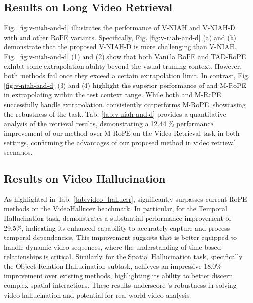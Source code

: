 
\setlength{\textfloatsep}{5pt}  %
\setlength{\intextsep}{5pt}     %
\setlength{\floatsep}{5pt} 

\subsection{Results on Long Video Retrieval}
Fig. \ref{fig:v-niah-and-d} illustrates the performance of V-NIAH and V-NIAH-D with \methodname and other RoPE variants. Specifically, Fig. \ref{fig:v-niah-and-d} (a) and (b) demonstrate that the proposed V-NIAH-D is more challenging than V-NIAH.
Fig. \ref{fig:v-niah-and-d} (1) and (2) show that both Vanilla RoPE and TAD-RoPE exhibit some extrapolation ability beyond the visual training context. However, both methods fail once they exceed a certain extrapolation limit.
In contrast, Fig. \ref{fig:v-niah-and-d} (3) and (4) highlight the superior performance of \methodname and M-RoPE in extrapolating within the test context range. While both \methodname and M-RoPE successfully handle extrapolation, \methodname consistently outperforms M-RoPE, showcasing the robustness of the task.
Tab. \ref{tab:v-niah-and-d} provides a quantitative analysis of the retrieval results, demonstrating a 12.44
\% performance improvement of our method over M-RoPE on the Video Retrieval task in both settings, confirming the advantages of our proposed method in video retrieval scenarios.

\subsection{Results on Video Hallucination}

As highlighted in Tab. \ref{tab:video_hallucer}, \methodname significantly surpasses current RoPE methods on the VideoHallucer benchmark. In particular, for the Temporal Hallucination task, \methodname demonstrates a substantial performance improvement of 29.5\%, indicating its enhanced capability to accurately capture and process temporal dependencies. This improvement suggests that \methodname is better equipped to handle dynamic video sequences, where the understanding of time-based relationships is critical. Similarly, for the Spatial Hallucination task, specifically the Object-Relation Hallucination subtask, \methodname achieves an impressive 18.0\% improvement over existing methods, highlighting its ability to better discern complex spatial interactions. These results underscore \methodname's robustness in solving video hallucination and potential for real-world video analysis.

